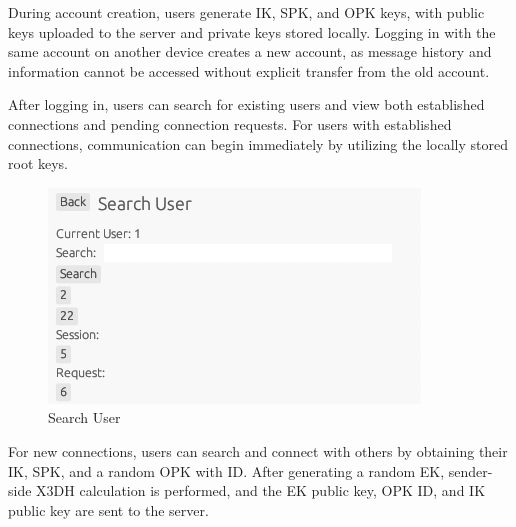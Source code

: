 \documentclass[9pt,a4paper,twoside]{rho-class/rho}
\begin{document}
During account creation, users generate IK, SPK, and OPK keys, with public keys uploaded to the server and private keys stored locally. Logging in with the same account on another device creates a new account, as message history and information cannot be accessed without explicit transfer from the old account.


After logging in, users can search for existing users and view both established connections and pending connection requests. For users with established connections, communication can begin immediately by utilizing the locally stored root keys.

\begin{figure}[H]
    \centering
    \includegraphics[width=1\linewidth]{figures/Screenshot 2024-11-04 at 00.20.35.png}
    \caption{Search User}
    \label{fig:enter-label}
\end{figure}

For new connections, users can search and connect with others by obtaining their IK, SPK, and a random OPK with ID. After generating a random EK, sender-side X3DH calculation is performed, and the EK public key, OPK ID, and IK public key are sent to the server.


\end{document}

